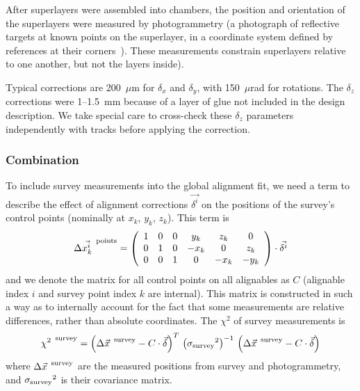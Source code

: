 After superlayers were assembled into chambers, the position and
orientation of the superlayers were measured by photogrammetry (a
photograph of reflective targets at known points on the superlayer, in
a coordinate system defined by references at their
corners~\cite{ref:Survey}).  These measurements constrain superlayers
relative to one another, but not the layers inside).

Typical corrections are 200~$\mu$m for $\delta_x$ and $\delta_y$, with
150~$\mu$rad for rotations.  The $\delta_z$ corrections were 1--1.5~mm
because of a layer of glue not included in the design description.  We
take special care to cross-check these $\delta_z$ parameters
independently with tracks before applying the correction.

\subsubsection{Combination}

To include survey measurements into the global alignment fit, we need
a term to describe the effect of alignment corrections
$\vec{\delta^i}$ on the positions of the survey's control points
(nominally at $x_k$, $y_k$, $z_k$).  This term is
\begin{equation}
{\Delta \vec{x^i_k}}^{\mbox{\scriptsize \, points}} =
\left(\begin{array}{c c c c c c}
1 & 0 & 0 & y_k & z_k & 0 \\
0 & 1 & 0 & -x_k & 0 & z_k \\
0 & 0 & 1 & 0 & -x_k & -y_k \\
\end{array}\right) \cdot
\vec{\delta^i}
\end{equation}
and we denote the matrix for all control points on all alignables as
$C$ (alignable index $i$ and survey point index $k$ are internal).
This matrix is constructed in such a way as to internally account for
the fact that some measurements are relative differences, rather than
absolute coordinates.  The $\chi^2$ of survey measurements is
\begin{equation}
{\chi^2}^{\mbox{\scriptsize \, survey}} = \left({\Delta \vec{x}}^{\mbox{\scriptsize \, survey}} - C \cdot \vec{\delta} \right)^T \, \left({\sigma_{\mbox{\scriptsize survey}}}^2\right)^{-1} \, \left({\Delta \vec{x}}^{\mbox{\scriptsize \, survey}} - C \cdot \vec{\delta} \right)
\end{equation}
where ${\Delta \vec{x}}^{\mbox{\scriptsize \, survey}}$ are the measured positions
from survey and photogrammetry, and ${\sigma_{\mbox{\scriptsize
survey}}}^2$ is their covariance matrix.

